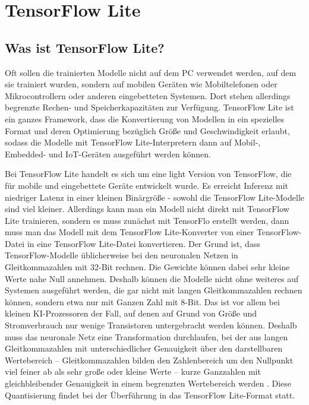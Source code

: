 %
%
%


\chapter{TensorFlow Lite}


\section{Was ist TensorFlow Lite?}

Oft sollen die trainierten Modelle nicht auf dem PC verwendet werden, auf dem sie trainiert wurden, sondern auf mobilen Geräten wie Mobiltelefonen oder Mikrocontrollern oder anderen eingebetteten Systemen. Dort stehen allerdings begrenzte Rechen- und Speicherkapazitäten zur Verfügung. TensorFlow Lite ist ein ganzes Framework, dass die Konvertierung von Modellen in ein spezielles Format und deren Optimierung bezüglich Größe und Geschwindigkeit erlaubt, sodass die Modelle mit TensorFlow Lite-Interpretern dann auf Mobil-, Embedded- und IoT-Geräten ausgeführt werden  können. \cite{Google.09.10.2020}\cite{Warden:2020}


Bei TensorFlow Lite handelt es sich um eine \glqq light\grqq{} Version von TensorFlow, die für mobile und eingebettete Geräte entwickelt wurde. 
Es erreicht Inferenz mit niedriger Latenz in einer kleinen Binärgröße - sowohl die TensorFlow Lite-Modelle sind viel kleiner. Allerdings kann man ein Modell nicht direkt mit TensorFlow Lite trainieren, sondern es muss zunächst mit TensorFlo erstellt werden, dann muss man das Modell mit dem TensorFlow Lite-Konverter von einer TensorFlow-Datei in eine TensorFlow Lite-Datei konvertieren.\cite{GoogleCoral:2019}
Der Grund ist, dass TensorFlow-Modelle üblicherweise bei den neuronalen Netzen in Gleitkommazahlen mit 32-Bit rechnen. Die Gewichte können dabei sehr kleine Werte nahe Null annehmen. Deshalb können die Modelle nicht ohne weiteres auf Systemen ausgeführt werden, die gar nicht mit langen Gleitkommazahlen rechnen können, sondern etwa nur mit Ganzen Zahl mit  8-Bit. Das ist vor allem bei kleinen KI-Prozessoren der Fall, auf denen auf Grund von Größe und Stromverbrauch nur  wenige Transistoren untergebracht werden können. Deshalb muss das neuronale Netz eine Transformation durchlaufen, \glqq bei der aus langen Gleitkommazahlen mit unterschiedlicher Genauigkeit über den darstellbaren Wertebereich -- Gleitkommazahlen bilden den Zahlenbereich um den Nullpunkt viel feiner ab als sehr große oder kleine Werte -- kurze Ganzzahlen mit gleichbleibender Genauigkeit in einem begrenzten Wertebereich werden \grqq \cite{Heise:2020}. Diese Quantisierung findet bei der Überführung in das TensorFlow Lite-Format statt.
 
